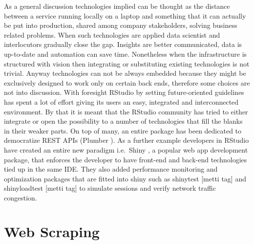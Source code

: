 \documentclass[
  12pt,
  a4paper,
  oneside]{book}
\theoremstyle{definition}
\theoremstyle{definition}
\theoremstyle{definition}
\theoremstyle{remark}
\begin{document}
As a general discussion technologies implied can be thought as the distance between a service running locally on a laptop and something that it can actually be put into production, shared among company stakeholders, solving business related problems. When such technologies are applied data scientist and interlocutors gradually close the gap. Insights are better communicated, data is up-to-date and automation can save time. Nonetheless when the infrastructure is structured with vision then integrating or substituting existing technologies is not trivial. Anyway technologies can not be always embedded because they might be exclusively designed to work only on certain back ends, therefore some choices are not into discussion. With foresight RStudio by setting future-oriented guidelines has spent a lot of effort giving its users an easy, integrated and interconnected environment. By that it is meant that the RStudio community has tried to either integrate or open the possibility to a number of technologies that fill the blanks in their weaker parts. On top of many, an entire package has been dedicated to democratize REST APIs (Plumber \citep{plumber}). As a further example developers in RStudio have created an entire new paradigm i.e.~Shiny \citep{shiny}, a popular web app development package, that enforces the developer to have front-end and back-end technologies tied up in the same IDE. They also added performance monitoring and optimization packages that are fitted into shiny such as shinytest {[}metti tag{]} and shinyloadtest {[}metti tag{]} to simulate sessions and verify network traffic congestion.

\hypertarget{scraping}{%
\chapter{Web Scraping}\label{scraping}}
\end{document}
